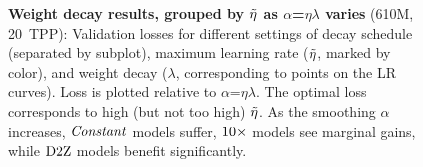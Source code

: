 \begin{figure}
  \centering
  \mbox{}
  \vspace{0mm}
  \mbox{}
  \caption{\textbf{Weight decay results, grouped by $\tilde{\eta}$ as
      $\alpha$=$\eta\lambda$ varies} (610M, 20~TPP):
    Validation losses for different settings of decay schedule
    (separated by subplot), maximum learning rate ($\tilde{\eta}$, marked
    by color), and weight decay ($\lambda$, corresponding to points on
    the LR curves).  Loss is plotted relative to
    $\alpha$=$\eta\lambda$.  The optimal loss corresponds to high (but
    not too high) $\tilde{\eta}$.  As the smoothing $\alpha$ increases,
    $\mbox{\emph{Constant}}$ models suffer, $\mbox{10}\times$ models see marginal gains,
    while $\mbox{D2Z}$ models benefit
    significantly.\label{fig:maxlr_wd:610M}}
\end{figure}
